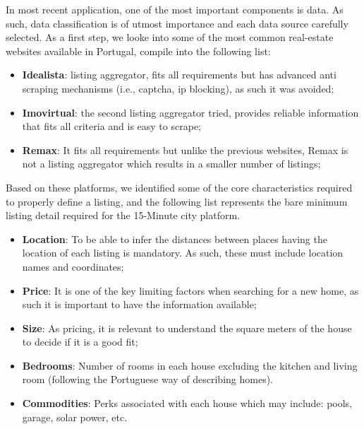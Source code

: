 

In most recent application, one of the most important components is data. As such, data classification is of utmost importance and each data source carefully selected. As a first step, we looke into some of the most common real-estate websites available in Portugal, compile into the following list:

\begin{itemize}
    \item \textbf{Idealista}: listing aggregator, fits all requirements but has advanced anti scraping mechanisms (i.e., captcha, ip blocking), as such it was avoided;
    \item \textbf{Imovirtual}: the second listing aggregator tried, provides reliable information that fits all criteria and is easy to scrape;
    \item \textbf{Remax}: It fits all requirements but unlike the previous websites, Remax is not a listing aggregator which results in a smaller number of listings;
\end{itemize}

Based on these platforms, we identified some of the core characteristics required to properly define a listing, and the following list represents the bare minimum listing detail required for the 15-Minute city platform.

\begin{itemize}
    \item \textbf{Location}: To be able to infer the distances between places having the location of each listing is mandatory. As such, these must include location names and coordinates;
    \item \textbf{Price}: It is one of the key limiting factors when searching for a new home, as such it is important to have the information available;
    \item \textbf{Size}: As pricing, it is relevant to understand the square meters of the house to decide if it is a good fit;
    \item \textbf{Bedrooms}: Number of rooms in each house excluding the kitchen and living room (following the Portuguese way of describing homes).
    \item \textbf{Commodities}: Perks associated with each house which may include: pools, garage, solar power, etc.
\end{itemize}

